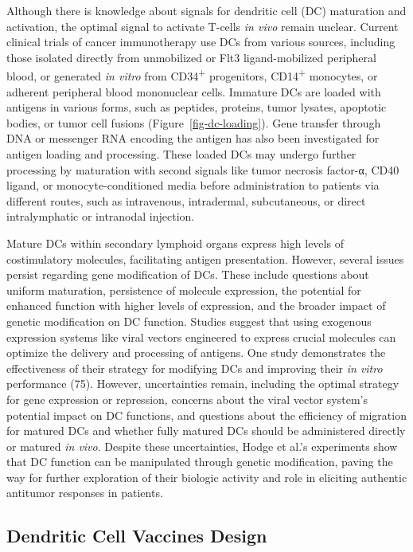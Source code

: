\documentclass[
]{article}
\begin{document}
Although there is knowledge about signals for dendritic cell (DC)
maturation and activation, the optimal signal to activate T-cells
\emph{in vivo} remain unclear. Current clinical trials of cancer
immunotherapy use DCs from various sources, including those isolated
directly from unmobilized or Flt3 ligand-mobilized peripheral blood, or
generated \emph{in vitro} from CD34\textsuperscript{+} progenitors,
CD14\textsuperscript{+} monocytes, or adherent peripheral blood
mononuclear cells. Immature DCs are loaded with antigens in various
forms, such as peptides, proteins, tumor lysates, apoptotic bodies, or
tumor cell fusions (Figure~\ref{fig-dc-loading}). Gene transfer through
DNA or messenger RNA encoding the antigen has also been investigated for
antigen loading and processing. These loaded DCs may undergo further
processing by maturation with second signals like tumor necrosis
factor-α, CD40 ligand, or monocyte-conditioned media before
administration to patients via different routes, such as intravenous,
intradermal, subcutaneous, or direct intralymphatic or intranodal
injection.

Mature DCs within secondary lymphoid organs express high levels of
costimulatory molecules, facilitating antigen presentation. However,
several issues persist regarding gene modification of DCs. These include
questions about uniform maturation, persistence of molecule expression,
the potential for enhanced function with higher levels of expression,
and the broader impact of genetic modification on DC function. Studies
suggest that using exogenous expression systems like viral vectors
engineered to express crucial molecules can optimize the delivery and
processing of antigens. One study demonstrates the effectiveness of
their strategy for modifying DCs and improving their \emph{in vitro}
performance (75). However, uncertainties remain, including the optimal
strategy for gene expression or repression, concerns about the viral
vector system's potential impact on DC functions, and questions about
the efficiency of migration for matured DCs and whether fully matured
DCs should be administered directly or matured \emph{in vivo}. Despite
these uncertainties, Hodge et al.'s experiments show that DC function
can be manipulated through genetic modification, paving the way for
further exploration of their biologic activity and role in eliciting
authentic antitumor responses in patients.

\subsection{Dendritic Cell Vaccines
Design}\label{dendritic-cell-vaccines-design}
\end{document}
